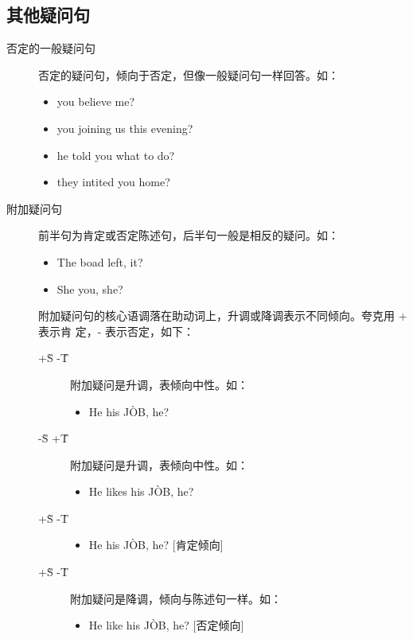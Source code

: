 \subsection{其他疑问句}
\begin{description}
\item[否定的一般疑问句] 否定的疑问句，倾向于否定，但像一般疑问句一样回答。如：
  \begin{itemize}
  \item {} you believe me?

  \item {} you joining us this evening?

  \item {} he told you what to do?

  \item {} they  intited you home?
  \end{itemize}
\item[附加疑问句] 前半句为肯定或否定陈述句，后半句一般是相反的疑问。如：
  \begin{itemize}
  \item The boad  left,  it?
  \item She  you,  she?
  \end{itemize}

  附加疑问句的核心语调落在助动词上，升调或降调表示不同倾向。夸克用 + 表示肯
  定，- 表示否定，如下：
  \begin{description}
  \item[+\`S -\'T] 附加疑问是升调，表倾向中性。如：
    \begin{itemize}
    \item He  his J\`OB,  he?
    \end{itemize}
  \item[-\`S +\'T] 附加疑问是升调，表倾向中性。如：
    \begin{itemize}
    \item He  likes his J\`OB,  he?
    \end{itemize}
  \item[+\`S -\`T]
    \begin{itemize} 附加疑问是降调，倾向与陈述句一样。如：
    \item He  his J\`OB,  he? [肯定倾向]
    \end{itemize}

  \item[+\`S -\`T] 附加疑问是降调，倾向与陈述句一样。如：
    \begin{itemize}
    \item He  like his J\`OB,  he? [否定倾向]
    \end{itemize}


\end{description}
\end{description}
